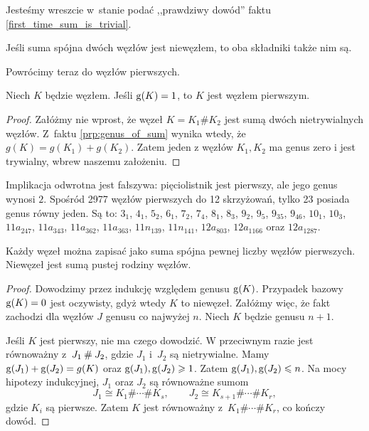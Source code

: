 Jesteśmy wreszcie w~stanie podać ,,prawdziwy dowód'' faktu \ref{first_time_sum_is_trivial}.

\begin{corollary}
\label{cor:connected_sum_no_inverses}%
    Jeśli suma spójna dwóch węzłów jest niewęzłem, to oba składniki także nim są.
\end{corollary}

Powrócimy teraz do węzłów pierwszych.
%

\begin{proposition}
    Niech $K$ będzie węzłem.
    Jeśli $\operatorname{g} (K) = 1$, to $K$ jest węzłem pierwszym.
\end{proposition}

\begin{proof}
    Załóżmy nie wprost, że węzeł $K = K_1 \# K_2$ jest sumą dwóch nietrywialnych węzłów.
    Z~faktu \ref{prp:genus_of_sum} wynika wtedy, że $g(K) = g(K_1) + g(K_2)$.
    Zatem jeden z węzłów $K_1, K_2$ ma genus zero i jest trywialny, wbrew naszemu założeniu.
\end{proof}

Implikacja odwrotna jest fałszywa: pięciolistnik jest pierwszy, ale jego genus wynosi $2$.
Spośród 2977 węzłów pierwszych do 12 skrzyżowań, tylko 23 posiada genus równy jeden.
Są to: $3_{1}$, $4_{1}$, $5_{2}$, $6_{1}$, $7_{2}$, $7_{4}$, $8_{1}$, $8_{3}$, $9_{2}$, $9_{5}$, $9_{35}$, $9_{46}$, $10_{1}$, $10_{3}$, $11a_{247}$, $11a_{343}$, $11a_{362}$, $11a_{363}$, $11n_{139}$, $11n_{141}$, $12a_{803}$, $12a_{1166}$ oraz $12a_{1287}$.

\begin{proposition}
\label{prp:knots_decompose_into_primes}%
    Każdy węzeł można zapisać jako suma spójna pewnej liczby węzłów pierwszych.
    Niewęzeł jest sumą pustej rodziny węzłów.
\end{proposition}

\begin{proof}
    Dowodzimy przez indukcję względem genusu $\operatorname{g} (K)$.
    Przypadek bazowy $\operatorname{g} (K) = 0$ jest oczywisty, gdyż wtedy $K$ to niewęzeł.
    Załóżmy więc, że fakt zachodzi dla węzłów $J$ genusu co najwyżej $n$.
    Niech $K$ będzie genusu $n + 1$.

    Jeśli $K$ jest pierwszy, nie ma czego dowodzić.
    W przeciwnym razie jest równoważny z~$J_1 \mathbin{\#} J_2$, gdzie $J_1$ i~$J_2$ są nietrywialne.
    Mamy $\operatorname{g} (J_1) + \operatorname{g} (J_2) = g(K)$ oraz $\operatorname{g}(J_1), \operatorname{g}(J_2) \geqslant 1$.
    Zatem $\operatorname{g}(J_1), \operatorname{g}(J_2) \leqslant n$.
    Na mocy hipotezy indukcyjnej, $J_1$ oraz $J_2$ są równoważne sumom
    \[
        J_1 \cong K_1 \# \cdots \# K_s, \qquad
        J_2 \cong K_{s+1} \# \cdots \# K_r,
    \]
    gdzie $K_i$ są pierwsze.
    Zatem $K$ jest równoważny z~$K_1\#\cdots\# K_r$, co kończy dowód.
\end{proof}

